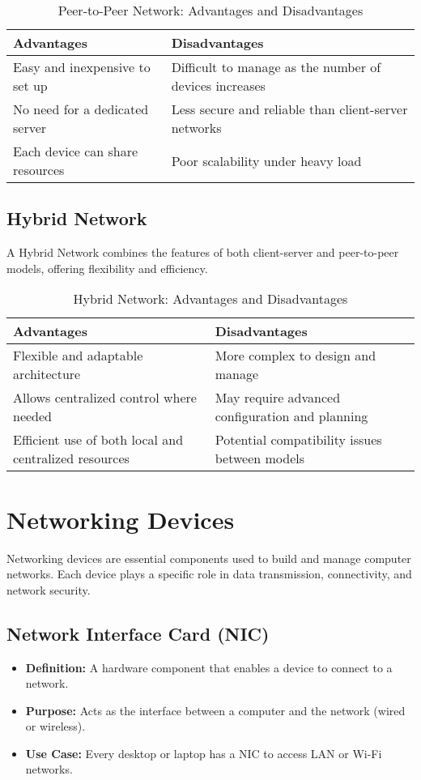 \begin{table}[H]
\centering
\caption{Peer-to-Peer Network: Advantages and Disadvantages}
\begin{tabularx}{\linewidth}{|X|X|}
\hline
\textbf{Advantages} & \textbf{Disadvantages} \\
\hline
Easy and inexpensive to set up & Difficult to manage as the number of devices increases \\
\hline
No need for a dedicated server & Less secure and reliable than client-server networks \\
\hline
Each device can share resources & Poor scalability under heavy load \\
\hline
\end{tabularx}
\end{table}

\subsection{Hybrid Network}
A Hybrid Network combines the features of both client-server and peer-to-peer models, offering flexibility and efficiency.

\begin{table}[H]
\centering
\caption{Hybrid Network: Advantages and Disadvantages}
\begin{tabularx}{\linewidth}{|X|X|}
\hline
\textbf{Advantages} & \textbf{Disadvantages} \\
\hline
Flexible and adaptable architecture & More complex to design and manage \\
\hline
Allows centralized control where needed & May require advanced configuration and planning \\
\hline
Efficient use of both local and centralized resources & Potential compatibility issues between models \\
\hline
\end{tabularx}
\end{table}



\section{Networking Devices}

Networking devices are essential components used to build and manage computer networks. Each device plays a specific role in data transmission, connectivity, and network security.

\subsection{Network Interface Card (NIC)}
\begin{itemize}[leftmargin=1.5cm]
  \item \textbf{Definition:} A hardware component that enables a device to connect to a network.
  \item \textbf{Purpose:} Acts as the interface between a computer and the network (wired or wireless).
  \item \textbf{Use Case:} Every desktop or laptop has a NIC to access LAN or Wi-Fi networks.
\end{itemize}

